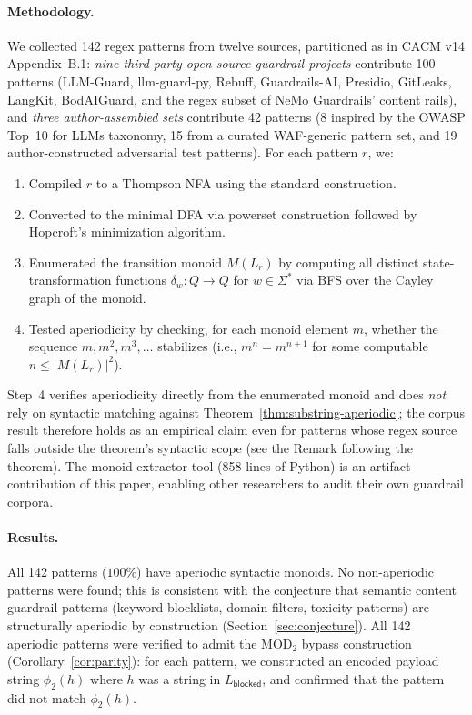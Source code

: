\documentclass[letterpaper,twocolumn,10pt]{article}
\theoremstyle{definition}
\theoremstyle{remark}
\begin{document}
\paragraph{Methodology.}
We collected 142 regex patterns from twelve sources, partitioned as in
CACM v14 Appendix~B.1: \emph{nine third-party open-source guardrail
projects} contribute 100 patterns (LLM-Guard, llm-guard-py, Rebuff,
Guardrails-AI, Presidio, GitLeaks, LangKit, BodAIGuard, and the regex
subset of NeMo Guardrails' content rails), and \emph{three
author-assembled sets} contribute 42 patterns (8 inspired by the OWASP
Top~10 for LLMs taxonomy, 15 from a curated WAF-generic pattern set, and
19 author-constructed adversarial test patterns).
For each pattern $r$, we:
\begin{enumerate}
  \item Compiled $r$ to a Thompson NFA using the standard construction.
  \item Converted to the minimal DFA via powerset construction followed by
    Hopcroft's minimization algorithm.
  \item Enumerated the transition monoid $M(L_r)$ by computing all distinct
    state-transformation functions $\delta_w\colon Q \to Q$ for $w \in \Sigma^*$
    via BFS over the Cayley graph of the monoid.
  \item Tested aperiodicity by checking, for each monoid element $m$, whether the
    sequence $m, m^2, m^3, \ldots$ stabilizes (i.e., $m^n = m^{n+1}$ for some
    computable $n \leq |M(L_r)|^2$).
\end{enumerate}
Step~4 verifies aperiodicity directly from the enumerated monoid and does
\emph{not} rely on syntactic matching against
Theorem~\ref{thm:substring-aperiodic}; the corpus result therefore holds
as an empirical claim even for patterns whose regex source falls outside
the theorem's syntactic scope (see the Remark following the theorem).
The monoid extractor tool (858 lines of Python) is an artifact contribution of
this paper, enabling other researchers to audit their own guardrail corpora.

\paragraph{Results.}
All 142 patterns ($100\%$) have aperiodic syntactic monoids.
No non-aperiodic patterns were found; this is consistent with the conjecture that
semantic content guardrail patterns (keyword blocklists, domain filters, toxicity
patterns) are structurally aperiodic by construction
(Section~\ref{sec:conjecture}).
All 142 aperiodic patterns were verified to admit the $\mathrm{MOD}_2$ bypass
construction (Corollary~\ref{cor:parity}): for each pattern, we constructed an
encoded payload string $\phi_2(h)$ where $h$ was a string in $L_{\mathsf{blocked}}$,
and confirmed that the pattern did not match $\phi_2(h)$.
\end{document}
